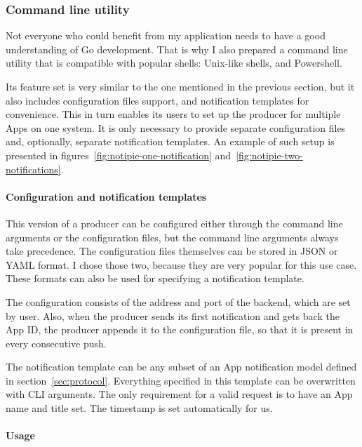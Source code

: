 \subsubsection{Command line utility}\label{sec:command-line-utility}

Not everyone who could benefit
from my application
needs to have a good understanding
of Go development.
That is why I also prepared
a command line utility
that is compatible with popular shells:
Unix-like shells,
and Powershell.

Its feature set is very similar
to the one mentioned in the previous section,
but it also includes configuration files support,
and notification templates for convenience.
This in turn enables its users
to set up the producer for multiple Apps
on one system.
It is only necessary to provide
separate configuration files
and, optionally, separate notification templates.
An example of such setup is presented
in figures~\ref{fig:notipie-one-notification}
and~\ref{fig:notipie-two-notifications}.

\paragraph*{Configuration and notification templates}\label{sec:configuration-and-notification-templates}

This version of a producer can be configured
either through the command line arguments
or the configuration files,
but the command line arguments
always take precedence.
The configuration files themselves
can be stored in \ac{JSON} or \ac{YAML} format.
I chose those two,
because they are very popular
for this use case.
These formats can also be used
for specifying a notification template.

The configuration consists of
the address and port of the backend,
which are set by user.
Also, when the producer sends its first notification
and gets back the App \ac{ID},
the producer appends it to the configuration file,
so that it is present in every consecutive push.

The notification template can be any
subset of an App notification model
defined in section~\ref{sec:protocol}.
Everything specified in this template
can be overwritten with \ac{CLI} arguments.
The only requirement for a valid request
is to have an App name and title set.
The timestamp is set automatically for us.

\paragraph*{Usage}\label{sec:producer-usage}

